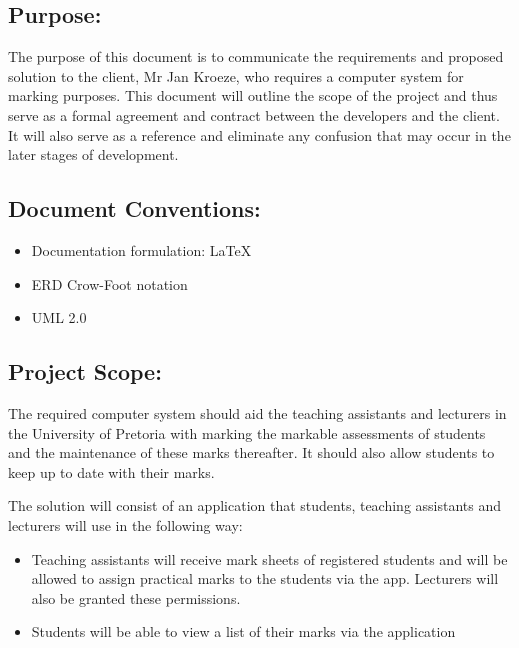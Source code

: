 \documentclass[12pt]{article}
\begin{document}
		\subsection{Purpose:}
		\vspace{0.1in}
		The purpose of this document is to communicate the requirements and proposed solution to the client, Mr Jan Kroeze, who requires a computer system for marking purposes. This document will outline the scope of the project and thus serve as a formal agreement and contract between the developers and the client. It will also serve as a reference and eliminate any confusion that may occur in the later stages of development. 
	
	\vspace{0.2in}
	
		\subsection{Document Conventions:}
		\vspace{0.1in}
		\begin{itemize}
			\item Documentation formulation: LaTeX
			\item ERD Crow-Foot notation
			\item UML 2.0
		\end{itemize}
	
	\vspace{0.2in}
	
		\subsection{Project Scope:}
		\vspace{0.1in}
		
		The required computer system should aid the teaching assistants and lecturers in the University of Pretoria with marking the markable assessments of students and the maintenance of these marks thereafter. It should also allow students to keep up to date with their marks. 
		
		\vspace{0.5cm}
		
		\begin{flushleft}
		The solution will consist of an application that students, teaching assistants and lecturers will use in the following way:
		\end{flushleft}
			\begin{itemize}
				\item Teaching assistants will receive mark sheets of registered students and will be allowed to assign practical marks to the students via the app. Lecturers will also be granted these permissions.
				\item Students will be able to view a list of their marks via the application
			\end{itemize}
			
\end{document}
